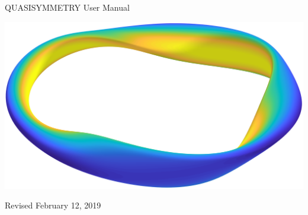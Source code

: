\begin{center}

\vspace*{1in}

{\Huge QUASISYMMETRY User Manual}

\vspace{2in}

\centerline{\includegraphics[width=6.5in]{m20180404_02_plotQuasisymmetricSolutionForPaperII_a.png}}


\vspace{1.0in}

Revised February 12, 2019

\end{center}

